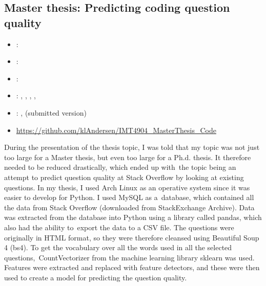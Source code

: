 \subsection{Master thesis: Predicting coding question quality}
\label{sec:master_thesis}
\begin{itemize} 
	\item {}: 
	\item {}: 
	\item {}: 
	\item {}: , , , , 
	\item {}: ,  (submitted version)
	\item {} \url{https://github.com/klAndersen/IMT4904_MasterThesis_Code}
\end{itemize} 
During the presentation of the thesis topic, I was told that my topic was not just too large for a Master thesis, but even too large for a Ph.d. thesis. 
It therefore needed to be reduced drastically, which ended up with the topic being an attempt to predict question quality at Stack Overflow by looking at existing questions. 
\vspace{0.5em}\newline
In my thesis, I used Arch Linux as an operative system since it was easier to develop for Python. 
I used MySQL as a database, which contained all the data from Stack Overflow (downloaded from StackExchange Archive). 
Data was extracted from the database into Python using a library called pandas, which also had the ability to export the data to a CSV file. 
\vspace{0.5em}\newline
The questions were originally in HTML format, so they were therefore cleansed using Beautiful Soup 4 (bs4). 
To get the vocabulary over all the words used in all the selected questions, CountVectorizer from the machine learning library sklearn was used. 
Features were extracted and replaced with feature detectors, and these were then used to create a model for predicting the question quality. 
